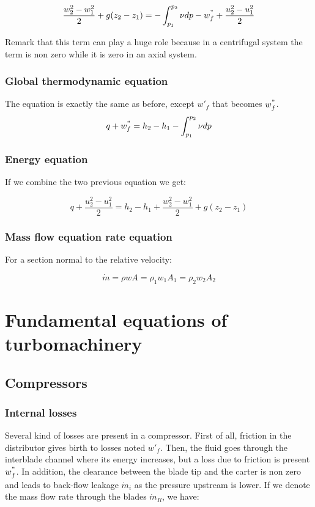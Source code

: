 \begin{equation}
 \frac{w_2^2 - w_1^2}{2} + g(z_2-z_1) = - \int _{p_1}^{p_2} \nu dp - w^"_f + \frac{u_2^2-u_1^2}{2}
 \label{2.5}
\end{equation}

Remark that this term can play a huge role because in a centrifugal system the term is non zero while it is zero in an axial system. 

\subsubsection{Global thermodynamic equation}
The equation is exactly the same as before, except $w'_f$ that becomes $w^"_f$. 
\begin{equation}
q + w^"_f = h_2 - h_1 - \int _{p_1}^{p_2} \nu dp
\end{equation}

\subsubsection{Energy equation}
If we combine the two previous equation we get: 

\begin{equation}
q + \frac{u_2^2-u_1^2}{2} = h_2 - h_1 + \frac{w_2^2 - w_1^2}{2} + g(z_2-z_1)
\end{equation}

\subsubsection{Mass flow equation rate equation}
For a section normal to the relative velocity:

\begin{equation}
\dot{m} = \rho w A = \rho _1 w_1 A_1 = \rho _2 w_2 A_2
\end{equation}


\section{Fundamental equations of turbomachinery}
\subsection{Compressors}
\subsubsection{Internal losses}
Several kind of losses are present in a compressor. First of all, friction in the distributor gives birth to losses noted $w'_f$. Then, the fluid goes through the interblade channel where its energy increases, but a loss due to friction is present $w^"_f$. In addition, the clearance between the blade tip and the carter is non zero and leads to back-flow leakage $\dot{m}_i$ as the pressure upstream is lower. If we denote the mass flow rate through the blades $\dot{m}_R$, we have: 

